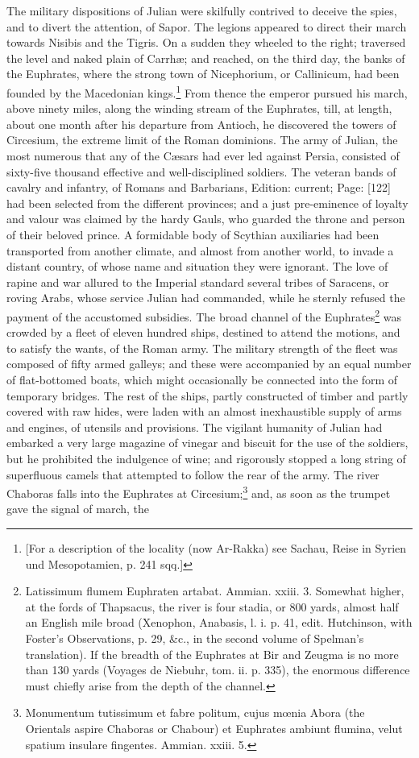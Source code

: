 The military dispositions of Julian were skilfully contrived to deceive the spies, and to divert the attention, of Sapor. The legions appeared to direct their march towards Nisibis and the Tigris. On a sudden they wheeled to the right; traversed the level and naked plain of Carrhæ; and reached, on the third day, the banks of the Euphrates, where the strong town of Nicephorium, or Callinicum, had been founded by the Macedonian kings.\footnote{[For a description of the locality (now Ar-Rakka) see Sachau, Reise in Syrien und Mesopotamien, p. 241 sqq.]} From thence the emperor pursued his march, above ninety miles, along the winding stream of the Euphrates, till, at length, about one month after his departure from Antioch, he discovered the towers of Circesium, the extreme limit of the Roman dominions. The army of Julian, the most numerous that any of the Cæsars had ever led against Persia, consisted of sixty-five thousand effective and well-disciplined soldiers. The veteran bands of cavalry and infantry, of Romans and Barbarians, Edition: current; Page: [122] had been selected from the different provinces; and a just pre-eminence of loyalty and valour was claimed by the hardy Gauls, who guarded the throne and person of their beloved prince. A formidable body of Scythian auxiliaries had been transported from another climate, and almost from another world, to invade a distant country, of whose name and situation they were ignorant. The love of rapine and war allured to the Imperial standard several tribes of Saracens, or roving Arabs, whose service Julian had commanded, while he sternly refused the payment of the accustomed subsidies. The broad channel of the Euphrates\footnote{Latissimum flumem Euphraten artabat. Ammian. xxiii. 3. Somewhat higher, at the fords of Thapsacus, the river is four stadia, or 800 yards, almost half an English mile broad (Xenophon, Anabasis, l. i. p. 41, edit. Hutchinson, with Foster\texthebrew{}’s Observations, p. 29, \&c., in the second volume of Spelman\texthebrew{}’s translation). If the breadth of the Euphrates at Bir and Zeugma is no more than 130 yards (Voyages de Niebuhr, tom. ii. p. 335), the enormous difference must chiefly arise from the depth of the channel.} was crowded by a fleet of eleven hundred ships, destined to attend the motions, and to satisfy the wants, of the Roman army. The military strength of the fleet was composed of fifty armed galleys; and these were accompanied by an equal number of flat-bottomed boats, which might occasionally be connected into the form of temporary bridges. The rest of the ships, partly constructed of timber and partly covered with raw hides, were laden with an almost inexhaustible supply of arms and engines, of utensils and provisions. The vigilant humanity of Julian had embarked a very large magazine of vinegar and biscuit for the use of the soldiers, but he prohibited the indulgence of wine; and rigorously stopped a long string of superfluous camels that attempted to follow the rear of the army. The river Chaboras falls into the Euphrates at Circesium;\footnote{Monumentum tutissimum et fabre politum, cujus mœnia Abora (the Orientals aspire Chaboras or Chabour) et Euphrates ambiunt flumina, velut spatium insulare fingentes. Ammian. xxiii. 5.} and, as soon as the trumpet gave the signal of march, the 